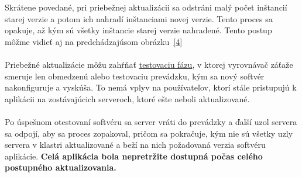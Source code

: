 \documentclass[10pt,twoside,slovak,a4paper]{article}
\begin{document}
Skrátene povedané, pri priebežnej aktualizácii sa odstráni malý počet inštancií starej verzie a potom ich nahradí inštanciami novej verzie. Tento proces sa opakuje, až kým sú všetky inštancie starej verzie nahradené\cite{7034783}. Tento postup môžme vidieť aj na predchádzajúsom obrázku~\ref{4} \\\\
Priebežné aktualizácie môžu zahŕňať \underline{testovaciu fázu}, v ktorej vyrovnávač záťaže smeruje len obmedzenú alebo testovaciu prevádzku, kým sa nový softvér nakonfiguruje a vyskúša. To nemá vplyv na  používateľov, ktorí stále pristupujú k aplikácii na zostávajúcich serveroch, ktoré ešte neboli aktualizované\cite{web1}. \\\\
Po úspešnom otestovaní softvéru sa server vráti do prevádzky a ďalší uzol servera sa odpojí, aby sa proces zopakoval, pričom sa pokračuje, kým nie sú všetky uzly servera v klastri aktualizované a beží na nich požadovaná verzia softvéru aplikácie. \textbf{Celá aplikácia bola nepretržite dostupná počas celého postupného aktualizovania.}\cite{web1}
\end{document}
